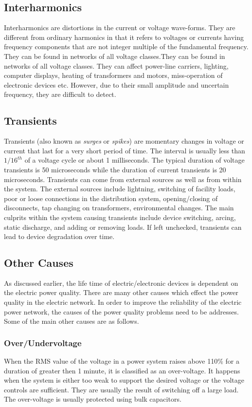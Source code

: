\subsection{Interharmonics}
Interharmonics are distortions in the current or voltage wave-forms. They are different from ordinary harmonics in that it refers to voltages or currents having frequency components that are not integer multiple of the fundamental frequency. They can be found in networks of all voltage classes.They can be found in networks of all voltage classes. They can affect power-line carriers, lighting, computer displays, heating of transformers and motors, miss-operation of electronic devices etc. However, due to their small amplitude and uncertain frequency, they are difficult to detect.

\subsection{Transients}
Transients (also known as \textit{surges} or \textit{spikes}) are momentary changes in voltage or current that last for a very short period of time. The interval is usually less than $1/16^{th}$ of a voltage cycle or about 1 milliseconds. The typical duration of voltage transients is 50 microseconds while the duration of current transients is 20 microseconds. Transients can come from external sources as well as from within the system. The external sources include lightning, switching of facility loads, poor or loose connections in the distribution system, opening/closing of disconnects, tap changing on transformers, environmental changes. The main culprits within the system causing transients include device switching, arcing, static discharge, and adding or removing loads. If left unchecked, transients can lead to device degradation over time.

\subsection{Other Causes}
As discussed earlier, the life time of electric/electronic devices is dependent on the electric power quality. There are many other causes which effect the power quality in the electric network. In order to improve the reliability of the electric power network, the causes of the power quality problems need to be addresses. Some of the main other causes are as follows.

\subsubsection{Over/Undervoltage}
When the RMS value of the voltage in a power system raises above 110\% for a duration of greater then 1 minute, it is classified as an over-voltage. It happens when the system is either too weak to support the desired voltage or the voltage controls are sufficient. They are usually the result of switching off a large load. The over-voltage is usually protected using bulk capacitors.


